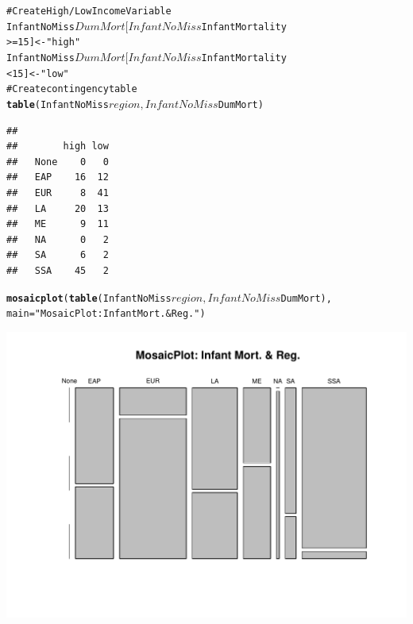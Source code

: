 \documentclass{beamer}\usepackage{graphicx, color}
\makeatletter
\def\maxwidth{ %
  \ifdim\Gin@nat@width>\linewidth
    \linewidth
  \else
    \Gin@nat@width
  \fi
}
\newcommand{\hlfunctioncall}[1]{\textcolor[rgb]{0.501960784313725,0,0.329411764705882}{\textbf{#1}}}%
\newcommand{\hlstring}[1]{\textcolor[rgb]{0.6,0.6,1}{#1}}%
\newcommand{\hlcomment}[1]{\textcolor[rgb]{0.180392156862745,0.6,0.341176470588235}{#1}}%
\newenvironment{kframe}{%
 \def\at@end@of@kframe{}%
 \ifinner\ifhmode%
  \def\at@end@of@kframe{\end{minipage}}%
  \begin{minipage}{\columnwidth}%
 \fi\fi%
 \def\FrameCommand##1{\hskip\@totalleftmargin \hskip-\fboxsep
 \colorbox{shadecolor}{##1}\hskip-\fboxsep
     \hskip-\linewidth \hskip-\@totalleftmargin \hskip\columnwidth}%
 \MakeFramed {\advance\hsize-\width
   \@totalleftmargin\z@ \linewidth\hsize
   \@setminipage}}%
 {\par\unskip\endMakeFramed%
 \at@end@of@kframe}
\newenvironment{knitrout}{}{} %
\makeatother
\begin{document}
\begin{frame}
\begin{knitrout}
\color{fgcolor}\begin{kframe}
\begin{alltt}
\hlcomment{# Create High/Low Income Variable}
InfantNoMiss$DumMort[InfantNoMiss$InfantMortality
                     >= 15] <- \hlstring{"high"}
InfantNoMiss$DumMort[InfantNoMiss$InfantMortality
                     < 15] <- \hlstring{"low"}
\hlcomment{# Create contingency table}
\hlfunctioncall{table}(InfantNoMiss$region, InfantNoMiss$DumMort)
\end{alltt}
\begin{verbatim}
##       
##        high low
##   None    0   0
##   EAP    16  12
##   EUR     8  41
##   LA     20  13
##   ME      9  11
##   NA      0   2
##   SA      6   2
##   SSA    45   2
\end{verbatim}
\end{kframe}
\end{knitrout}

\end{frame}

\begin{frame}
\begin{knitrout}
\color{fgcolor}\begin{kframe}
\begin{alltt}
\hlfunctioncall{mosaicplot}(\hlfunctioncall{table}(InfantNoMiss$region, 
            InfantNoMiss$DumMort),
            main = \hlstring{"MosaicPlot: Infant Mort. & Reg."})
\end{alltt}
\end{kframe}

{\centering \includegraphics[width=\maxwidth]{figure/MoasicPlot} 

}


\end{knitrout}

\end{frame}
\end{document}
